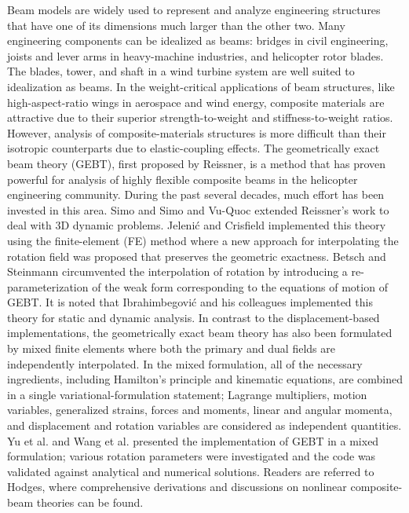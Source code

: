 Beam models are widely used to represent and analyze engineering structures
that have one of its dimensions much larger than the other two. Many
engineering components can be idealized as beams: bridges in civil
engineering, joists and lever arms in heavy-machine industries, and
helicopter rotor blades. The blades, tower, and shaft in a wind turbine
system are well suited to idealization as beams. In the weight-critical
applications of beam structures, like high-aspect-ratio wings in aerospace
and wind energy, composite materials are attractive due to their superior
strength-to-weight and stiffness-to-weight ratios.  However, analysis of
composite-materials structures is more difficult than their isotropic
counterparts due to elastic-coupling effects. The geometrically exact beam
theory (GEBT), first proposed by Reissner\cite{Ressiner1973}, is a
method that has proven powerful for analysis of highly flexible composite
beams in the helicopter engineering community. During the past several
decades, much effort has been invested in this area. Simo\cite{Simo1985} and
Simo and Vu-Quoc\cite{Simo1986} extended Reissner's work to deal with 3D
dynamic problems. Jeleni\'c and Crisfield\cite{Crisfield1999} implemented
this theory using the finite-element (FE) method where a new approach for
interpolating the rotation field was proposed that preserves the geometric
exactness. Betsch and Steinmann\cite{Betsch2002} circumvented the
interpolation of rotation by introducing a re-parameterization of the weak
form corresponding to the equations of motion of GEBT. It is noted that
Ibrahimbegovi\'c and his colleagues implemented this theory for
static\cite{Ibrahim1995} and dynamic\cite{Ibrahim1998} analysis. In contrast
to the displacement-based implementations, the geometrically exact beam theory
has also been formulated by mixed finite elements where both the primary and
dual fields are independently interpolated. In the mixed formulation, all of the necessary
ingredients, including Hamilton's principle and kinematic equations, are
combined in a single variational-formulation statement; Lagrange
multipliers, motion variables, generalized strains, forces and moments,
linear and angular momenta, and displacement and rotation variables are
considered as independent quantities. Yu et al.\cite{YuGEBT} and Wang et
al.\cite{Wang:GEBT2013}
presented the implementation of GEBT in a mixed formulation; various
rotation parameters were investigated and the code was validated against
analytical and numerical solutions. Readers are referred to
Hodges\cite{HodgesBeamBook}, where comprehensive derivations and discussions
on nonlinear composite-beam theories can be found.

